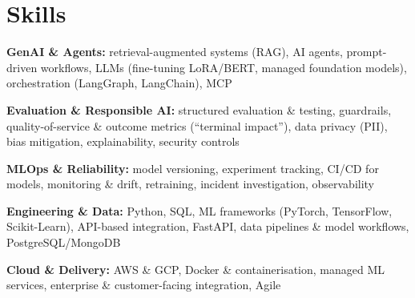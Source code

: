 \documentclass[10pt,a4paper]{article}
\begin{document}
\section{Skills}
\begin{tight}
  \item[\textcolor{accent}{\small$\bullet$}] \textbf{GenAI \& Agents:} retrieval-augmented systems (RAG), AI agents, prompt-driven workflows, LLMs (fine-tuning LoRA/BERT, managed foundation models), orchestration (LangGraph, LangChain), MCP
  \item[\textcolor{accent}{\small$\bullet$}] \textbf{Evaluation \& Responsible AI:} structured evaluation \& testing, guardrails, quality-of-service \& outcome metrics (``terminal impact''), data privacy (PII), bias mitigation, explainability, security controls
  \item[\textcolor{accent}{\small$\bullet$}] \textbf{MLOps \& Reliability:} model versioning, experiment tracking, CI/CD for models, monitoring \& drift, retraining, incident investigation, observability
  \item[\textcolor{accent}{\small$\bullet$}] \textbf{Engineering \& Data:} Python, SQL, ML frameworks (PyTorch, TensorFlow, Scikit-Learn), API-based integration, FastAPI, data pipelines \& model workflows, PostgreSQL/MongoDB
  \item[\textcolor{accent}{\small$\bullet$}] \textbf{Cloud \& Delivery:} AWS \& GCP, Docker \& containerisation, managed ML services, enterprise \& customer-facing integration, Agile
\end{tight}

\end{document}

